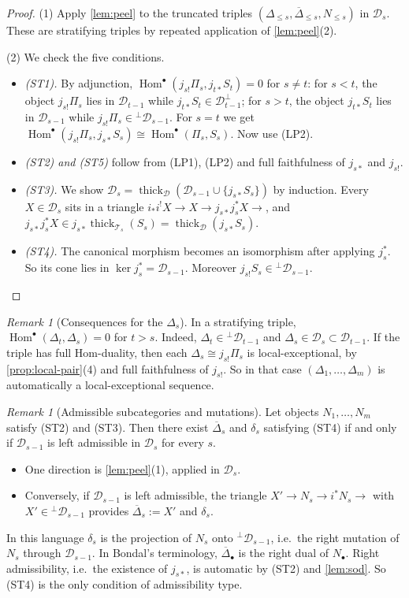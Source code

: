 \documentclass[11pt,reqno]{amsart}
\theoremstyle{plain}
\theoremstyle{definition}
\theoremstyle{remark}
\newtheorem{remark}[theorem]{Remark}
\DeclareMathOperator{\Hom}{Hom}
\newcommand{\thick}[2][\cD]{\operatorname{thick}_{#1}(#2)}
\newcommand{\Deltabar}{\overline{\Delta}}
\newcommand{\cD}{\mathcal{D}}
\newcommand{\cT}{\mathcal{T}}
\begin{document}
\begin{proof}
(1) Apply \cref{lem:peel} to the truncated triples $(\Delta_{\le s},\Deltabar_{\le s},N_{\le s})$ in $\cD_s$. These are stratifying triples by repeated application of \cref{lem:peel}(2).

(2) We check the five conditions.
\begin{itemize}
\item \emph{(ST1).} By adjunction, $\Hom^\bullet(j_{s!}\Pi_s,j_{t*}S_t)=0$ for $s\ne t$: for $s<t$, the object $j_{s!}\Pi_s$ lies in $\cD_{t-1}$ while $j_{t*}S_t\in\cD_{t-1}^\perp$; for $s>t$, the object $j_{t*}S_t$ lies in $\cD_{s-1}$ while $j_{s!}\Pi_s\in{}^\perp\cD_{s-1}$. For $s=t$ we get $\Hom^\bullet(j_{s!}\Pi_s,j_{s*}S_s)\cong\Hom^\bullet(\Pi_s,S_s)$. Now use (LP2).
\item \emph{(ST2) and (ST5)} follow from (LP1), (LP2) and full faithfulness of $j_{s*}$ and $j_{s!}$.
\item \emph{(ST3).} We show $\cD_s=\thick{\cD_{s-1}\cup\{j_{s*}S_s\}}$ by induction. Every $X\in\cD_s$ sits in a triangle $i_*i^!X\to X\to j_{s*}j_s^*X\to$, and $j_{s*}j_s^*X\in j_{s*}\thick[\cT_s]{S_s}=\thick{j_{s*}S_s}$.
\item \emph{(ST4).} The canonical morphism becomes an isomorphism after applying $j_s^*$. So its cone lies in $\ker j_s^*=\cD_{s-1}$. Moreover $j_{s!}S_s\in{}^\perp\cD_{s-1}$. \qedhere
\end{itemize}
\end{proof}

\begin{remark}[Consequences for the $\Delta_s$]\label{rem:Delta-semiorth}
In a stratifying triple, $\Hom^\bullet(\Delta_t,\Delta_s)=0$ for $t>s$. Indeed, $\Delta_t\in{}^\perp\cD_{t-1}$ and $\Delta_s\in\cD_s\subset\cD_{t-1}$. If the triple has full Hom-duality, then each $\Delta_s\cong j_{s!}\Pi_s$ is local-exceptional, by \cref{prop:local-pair}(4) and full faithfulness of $j_{s!}$. So in that case $(\Delta_1,\dots,\Delta_m)$ is automatically a local-exceptional sequence.
\end{remark}

\begin{remark}[Admissible subcategories and mutations]\label{rem:HD4}
Let objects $N_1,\dots,N_m$ satisfy (ST2) and (ST3). Then there exist $\Deltabar_s$ and $\delta_s$ satisfying (ST4) if and only if $\cD_{s-1}$ is left admissible in $\cD_s$ for every $s$.
\begin{itemize}
\item One direction is \cref{lem:peel}(1), applied in $\cD_s$.
\item Conversely, if $\cD_{s-1}$ is left admissible, the triangle $X'\to N_s\to i^*N_s\to$ with $X'\in{}^\perp\cD_{s-1}$ provides $\Deltabar_s:=X'$ and $\delta_s$.
\end{itemize}
In this language $\delta_s$ is the projection of $N_s$ onto ${}^\perp\cD_{s-1}$, i.e.\ the right mutation of $N_s$ through $\cD_{s-1}$. In Bondal's terminology, $\Deltabar_\bullet$ is the right dual of $N_\bullet$. Right admissibility, i.e.\ the existence of $j_{s*}$, is automatic by (ST2) and \cref{lem:sod}. So (ST4) is the only condition of admissibility type.
\end{remark}
\end{document}
